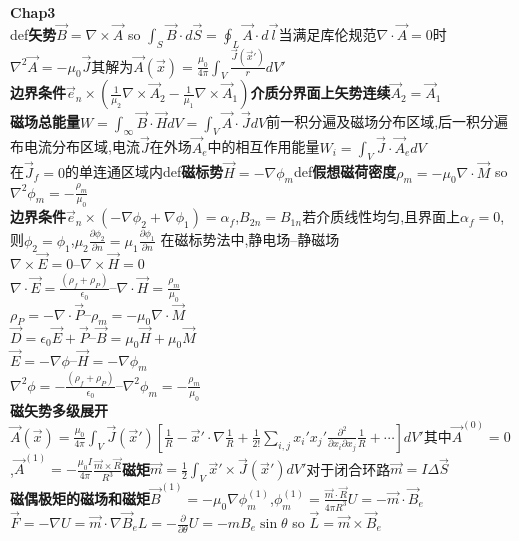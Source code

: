 \documentclass[10pt,a4paper]{article}
\begin{document}
\begin{multicols}{2}
\textbf{Chap3}\\
def\textbf{矢势}$\vec{B}=\nabla\times\vec{A}$ so $\int_S\vec{B}\cdot d\vec{S}=\oint_L\vec{A}\cdot d\vec{l}$当满足库伦规范$\nabla\cdot\vec{A}=0$时$\nabla^2\vec{A}=-\mu_0\vec{J}$其解为$\vec{A}(\vec{x})=\frac{\mu_0}{4\pi}\int_V\frac{\vec{J}(\vec{x}')}{r}dV'$\\
\textbf{边界条件}$\vec{e}_n\times(\frac{1}{\mu_2}\nabla\times\vec{A}_2-\frac{1}{\mu_1}\nabla\times\vec{A}_1)$\textbf{介质分界面上矢势连续}$\vec{A}_2=\vec{A}_1$\\
\textbf{磁场总能量}$W=\int_{\infty}\vec{B}\cdot\vec{H}dV=\int_V\vec{A}\cdot\vec{J}dV$前一积分遍及磁场分布区域,后一积分遍布电流分布区域,电流$\vec{J}$在外场$\vec{A}_e$中的相互作用能量$W_i=\int_V\vec{J}\cdot\vec{A}_edV$\\
在$\vec{J}_f=0$的单连通区域内def\textbf{磁标势}$\vec{H}=-\nabla\phi_m$def\textbf{假想磁荷密度}$\rho_m=-\mu_0\nabla\cdot\vec{M}$ so $\nabla^2\phi_m=-\frac{\rho_m}{\mu_0}$\\
\textbf{边界条件}$\vec{e}_n\times(-\nabla\phi_2+\nabla\phi_1)=\alpha_f$,$B_{2n}=B_{1n}$若介质线性均匀,且界面上$\alpha_f=0$,则$\phi_2=\phi_1$,$\mu_2\frac{\partial\phi_2}{\partial n}=\mu_1\frac{\partial\phi_1}{\partial n}$
在磁标势法中,静电场--静磁场\\
$\nabla\times\vec{E}=0$--$\nabla\times\vec{H}=0$\\
$\nabla\cdot\vec{E}=\frac{(\rho_f+\rho_P)}{\epsilon_0}$--$\nabla\cdot\vec{H}=\frac{\rho_m}{\mu_0}$\\
$\rho_P=-\nabla\cdot\vec{P}$--$\rho_m=-\mu_0\nabla\cdot\vec{M}$\\
$\vec{D}=\epsilon_0\vec{E}+\vec{P}$--$\vec{B}=\mu_0\vec{H}+\mu_0\vec{M}$\\
$\vec{E}=-\nabla\phi$--$\vec{H}=-\nabla\phi_m$\\
$\nabla^2\phi=-\frac{(\rho_f+\rho_P)}{\epsilon_0}$--$\nabla^2\phi_m=-\frac{\rho_m}{\mu_0}$\\
\textbf{磁矢势多级展开}$\vec{A}(\vec{x})=\frac{\mu_0}{4\pi}\int_V\vec{J}(\vec{x}')[\frac{1}{R}-\vec{x}'\cdot\nabla\frac{1}{R}+\frac{1}{2!}\sum_{i,j}x_i'x_j'\frac{\partial^2}{\partial x_i\partial x_j}\frac{1}{R}+\cdots]dV'$其中$\vec{A}^{(0)}=0$,$\vec{A}^{(1)}=-\frac{\mu_0I}{4\pi}\frac{\vec{m}\times\vec{R}}{R^3}$\textbf{磁矩}$\vec{m}=\frac{1}{2}\int_V\vec{x}'\times\vec{J}(\vec{x}')dV'$对于闭合环路$\vec{m}=I\Delta\vec{S}$\\
\textbf{磁偶极矩的磁场和磁矩}$\vec{B}^{(1)}=-\mu_0\nabla\phi_m^{(1)}$,$\phi_m^{(1)}=\frac{\vec{m}\cdot\vec{R}}{4\pi R^3}$$U=-\vec{m}\cdot\vec{B}_e$$\vec{F}=-\nabla U=\vec{m}\cdot\nabla\vec{B}_e$$L=-\frac{\partial}{\partial\theta}U=-mB_e\sin\theta$ so $\vec{L}=\vec{m}\times\vec{B}_e$
\end{multicols}
\end{document}
